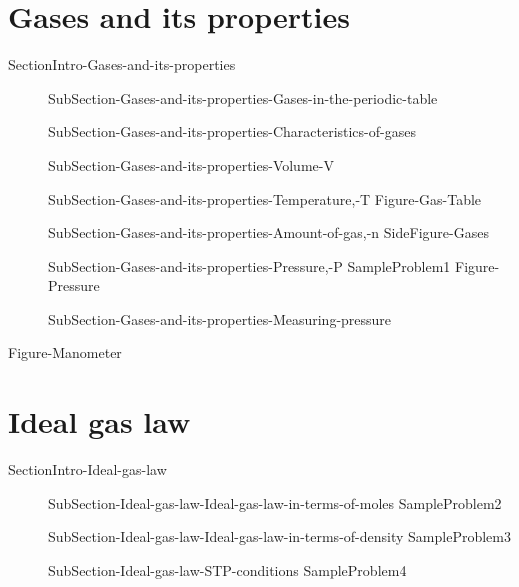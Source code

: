 \documentclass[main.tex]{subfiles}
\newcommand\chapterlabel{Ch-Gas}\setcounter{figurenewcounter}{0}\setcounter{tablenewcounter}{0}\setcounter{formulanewcounter}{0}\chapterpicture{../{\chapterlabel}/figure1}\chapterpicturelabel{PngImg}
\begin{document}
\section{Gases and its properties} {SectionIntro-Gases-and-its-properties}
\sloppy \begin{description}
\item[]  {SubSection-Gases-and-its-properties-Gases-in-the-periodic-table}
\item[]  {SubSection-Gases-and-its-properties-Characteristics-of-gases}
 \item[] {SubSection-Gases-and-its-properties-Volume-V}
 \item[]{SubSection-Gases-and-its-properties-Temperature,-T}
 {Figure-Gas-Table}
 \item[] {SubSection-Gases-and-its-properties-Amount-of-gas,-n}
 {SideFigure-Gases}
\item[] {SubSection-Gases-and-its-properties-Pressure,-P}
{SampleProblem1}
 {Figure-Pressure}
\item[]  {SubSection-Gases-and-its-properties-Measuring-pressure}
\end{description}



 {Figure-Manometer} \section{Ideal gas law}{SectionIntro-Ideal-gas-law}
\sloppy \begin{description}
\item[]  {SubSection-Ideal-gas-law-Ideal-gas-law-in-terms-of-moles}
{SampleProblem2}
 \item[] {SubSection-Ideal-gas-law-Ideal-gas-law-in-terms-of-density}
{SampleProblem3}
 \item[] {SubSection-Ideal-gas-law-STP-conditions}
{SampleProblem4}
\end{description}
\end{document}
